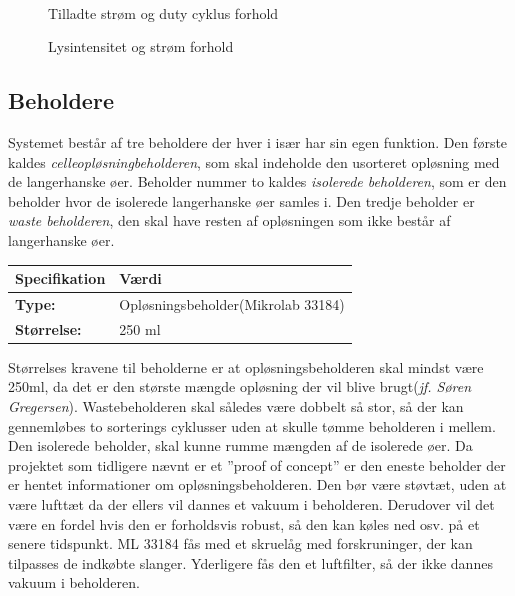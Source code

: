 \begin{figure}[htbp]
\begin{minipage}[b]{0.48\textwidth}
\end{minipage} \\ %
\begin{minipage}[t]{0.48\textwidth}
\caption{Tilladte strøm og duty cyklus forhold} %
\label{fig:LED1}
\end{minipage} \hfill
\begin{minipage}[t]{0.48\textwidth}
\caption{Lysintensitet og strøm forhold} %
\label{fig:LED2}
\end{minipage}
\end{figure}

\newpage
\subsection{Beholdere}
Systemet består af tre beholdere der hver i især har sin egen funktion. Den første kaldes \textit{celleopløsningbeholderen}, som skal indeholde den usorteret opløsning med de langerhanske øer. Beholder nummer to kaldes \textit{isolerede beholderen}, som er den beholder hvor de isolerede langerhanske øer samles i. Den tredje beholder er \textit{waste beholderen}, den skal have resten af opløsningen som ikke består af langerhanske øer.
\begin{center}
		\begin{longtable}{ | m{6.5cm} | m{6.5cm}| } 
			\hline
			\textbf{Specifikation} &\textbf{Værdi} \\ 
			\hline
			\textbf{Type:} & Opløsningsbeholder(Mikrolab 33184) \\ 
			\hline
			\textbf{Størrelse:} & 250 ml \\ 
			\hline
		\end{longtable}
\end{center}
Størrelses kravene til beholderne er at opløsningsbeholderen skal mindst være 250ml, da det er den største mængde opløsning der vil blive brugt(\textit{jf. Søren Gregersen}). Wastebeholderen skal således være dobbelt så stor, så der kan gennemløbes to sorterings cyklusser uden at skulle tømme beholderen i mellem. Den isolerede beholder, skal kunne rumme mængden af de isolerede øer. Da projektet som tidligere nævnt er et ”proof of concept” er den eneste beholder der er hentet informationer om opløsningsbeholderen. Den bør være støvtæt, uden at være lufttæt da der ellers vil dannes et vakuum i beholderen. Derudover vil det være en fordel hvis den er forholdsvis robust, så den kan køles ned osv. på et senere tidspunkt. ML 33184 fås med et skruelåg med forskruninger, der kan tilpasses de indkøbte slanger. Yderligere fås den et luftfilter, så der ikke dannes vakuum i beholderen.


